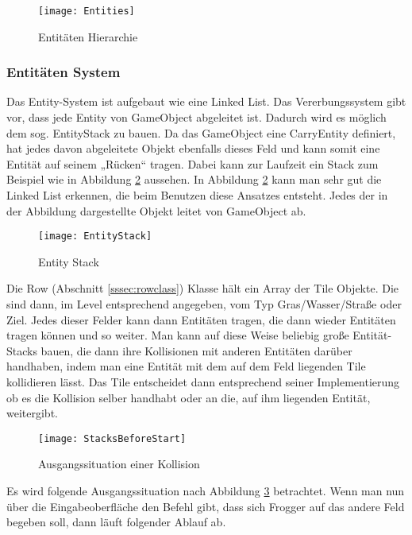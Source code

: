 \documentclass[a4paper,10pt]{report}
\begin{document}
{{{				\begin{figure}			
					\texttt{[image: Entities]}
					\caption{Entitäten Hierarchie}
					\label{fig:umlentities}
				\end{figure}							
			}
			
			\subsubsection{Entitäten System}
			{
				Das Entity-System ist aufgebaut wie eine Linked List. Das Vererbungssystem gibt vor, dass jede Entity von GameObject abgeleitet ist. Dadurch wird es möglich dem sog. EntityStack zu bauen.
				Da das GameObject eine CarryEntity definiert, hat jedes davon abgeleitete Objekt ebenfalls dieses Feld und kann somit eine Entität auf seinem „Rücken“ tragen.
				\newline \newline				
				\noindent
				Dabei kann zur Laufzeit ein Stack zum Beispiel wie in Abbildung \ref{fig:entitystack} aussehen.
				\newline \newline
				\noindent
				In Abbildung \ref{fig:entitystack} kann man sehr gut die Linked List erkennen, die beim Benutzen diese Ansatzes entsteht. 
				Jedes der in der Abbildung dargestellte Objekt leitet von GameObject ab. 
				\begin{figure}[h]			
					\texttt{[image: EntityStack]}
					\caption{Entity Stack}
					\label{fig:entitystack}
				\end{figure}
				\newline
				\noindent
				Die Row (Abschnitt \ref{sssec:rowclass}) Klasse hält ein Array der Tile Objekte. Die sind dann, im Level entsprechend angegeben, vom Typ Gras/Wasser/Straße oder Ziel. 
				Jedes dieser Felder kann dann Entitäten tragen, die dann wieder Entitäten tragen können und so weiter. 
				Man kann auf diese Weise beliebig große Entität-Stacks bauen, die dann ihre Kollisionen mit anderen Entitäten darüber handhaben, 
				indem man eine Entität mit dem auf dem Feld liegenden Tile kollidieren lässt. 
				Das Tile entscheidet dann entsprechend seiner Implementierung ob es die Kollision selber handhabt oder an die, auf ihm liegenden Entität, weitergibt.

				\begin{figure}[h]			
					\texttt{[image: StacksBeforeStart]}
					\caption{Ausgangssituation einer Kollision}
					\label{fig:collisionStart}
				\end{figure}
				\noindent
				Es wird folgende Ausgangssituation nach Abbildung \ref{fig:collisionStart} betrachtet.
				\newline \newline
				Wenn man nun über die Eingabeoberfläche den Befehl gibt, dass sich Frogger auf das andere Feld begeben soll, dann läuft folgender Ablauf ab.

}}}
\end{document}

